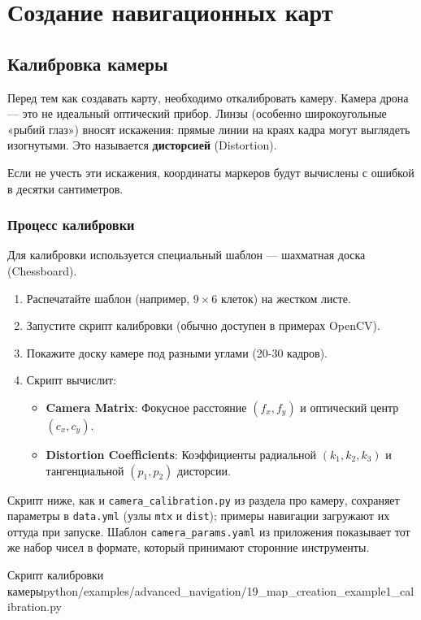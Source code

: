 \section{Создание навигационных карт}

\subsection{Калибровка камеры}
Перед тем как создавать карту, необходимо откалибровать камеру. Камера дрона — это не идеальный оптический прибор. Линзы (особенно широкоугольные «рыбий глаз») вносят искажения: прямые линии на краях кадра могут выглядеть изогнутыми. Это называется \textbf{дисторсией} (Distortion).

Если не учесть эти искажения, координаты маркеров будут вычислены с ошибкой в десятки сантиметров.

\subsubsection{Процесс калибровки}
Для калибровки используется специальный шаблон — шахматная доска (Chessboard).
\begin{enumerate}
    \item Распечатайте шаблон (например, $9 \times 6$ клеток) на жестком листе.
    \item Запустите скрипт калибровки (обычно доступен в примерах OpenCV).
    \item Покажите доску камере под разными углами (20-30 кадров).
    \item Скрипт вычислит:
    \begin{itemize}
        \item \textbf{Camera Matrix}: Фокусное расстояние $(f_x, f_y)$ и оптический центр $(c_x, c_y)$.
        \item \textbf{Distortion Coefficients}: Коэффициенты радиальной $(k_1, k_2, k_3)$ и тангенциальной $(p_1, p_2)$ дисторсии.
    \end{itemize}
\end{enumerate}

Скрипт ниже, как и \texttt{camera\_calibration.py} из раздела про камеру, сохраняет параметры в \texttt{data.yml} (узлы \texttt{mtx} и \texttt{dist}); примеры навигации загружают их оттуда при запуске. Шаблон \texttt{camera\_params.yaml} из приложения показывает тот же набор чисел в формате, который принимают сторонние инструменты.

\begin{codefiletitle}[python]{Скрипт калибровки камеры}{python/examples/advanced_navigation/19_map_creation_example1_calibration.py}
\end{codefiletitle}

